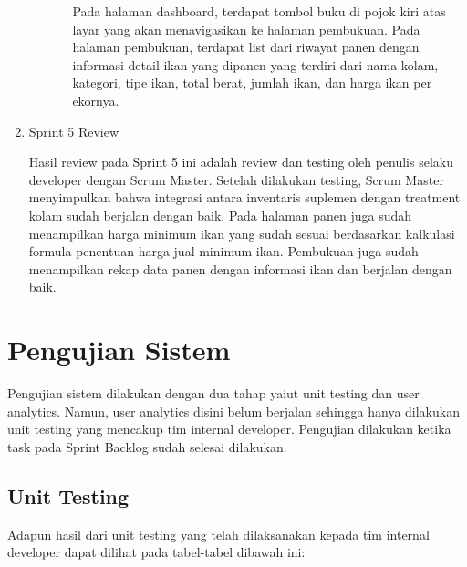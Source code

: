 \begin{spacing}{1.5}
\begin{enumerate}
\begin{enumerate}
\begin{itemize}
				Pada halaman dashboard, terdapat tombol buku di pojok kiri atas layar yang akan menavigasikan ke halaman pembukuan. Pada halaman pembukuan, terdapat list dari riwayat panen dengan informasi detail ikan yang dipanen yang terdiri dari nama kolam, kategori, tipe ikan, total berat, jumlah ikan, dan harga ikan per ekornya.
			\end{itemize}
		\end{enumerate}

		\item Sprint 5 Review
		
		Hasil review pada Sprint 5 ini adalah review dan testing oleh penulis selaku developer dengan Scrum Master. Setelah dilakukan testing, Scrum Master menyimpulkan bahwa integrasi antara inventaris suplemen dengan treatment kolam sudah berjalan dengan baik. Pada halaman panen juga sudah menampilkan harga minimum ikan yang sudah sesuai berdasarkan kalkulasi formula penentuan harga jual minimum ikan. Pembukuan juga sudah menampilkan rekap data panen dengan informasi ikan dan berjalan dengan baik.
 
	\end{enumerate}

\section{Pengujian Sistem}

Pengujian sistem dilakukan dengan dua tahap yaiut unit testing dan user analytics. Namun, user analytics disini belum berjalan sehingga hanya dilakukan unit testing yang mencakup tim internal developer. Pengujian dilakukan ketika task pada Sprint Backlog sudah selesai dilakukan.

\subsection{Unit Testing}

Adapun hasil dari unit testing yang telah dilaksanakan kepada tim internal developer dapat dilihat pada tabel-tabel dibawah ini:


\end{spacing}
